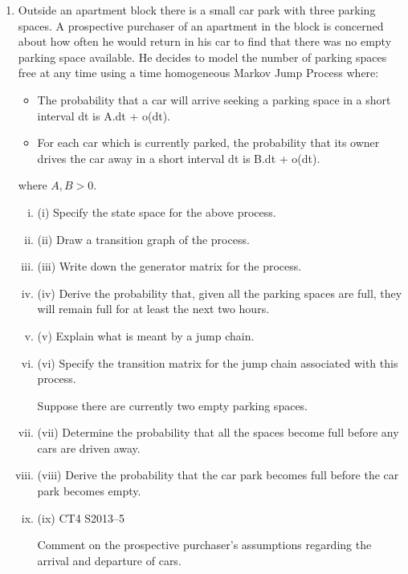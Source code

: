 \documentclass[a4paper,12pt]{article}
\begin{document}
\begin{enumerate}
\item Outside an apartment block there is a small car park with three parking spaces. A
prospective purchaser of an apartment in the block is concerned about how often he
would return in his car to find that there was no empty parking space available. He
decides to model the number of parking spaces free at any time using a time
homogeneous Markov Jump Process where:
\begin{itemize}
\item The probability that a car will arrive seeking a parking space in a short interval
dt is A.dt + o(dt).
\item For each car which is currently parked, the probability that its owner drives the
car away in a short interval dt is B.dt + o(dt).
\end{itemize}
where $A, B > 0$.
\begin{enumerate}[(i)]
\item (i) Specify the state space for the above process. 
\item (ii) Draw a transition graph of the process. 
\item (iii) Write down the generator matrix for the process. 
\item (iv) Derive the probability that, given all the parking spaces are full, they will
remain full for at least the next two hours. 
\item (v) Explain what is meant by a jump chain. 
\item (vi) Specify the transition matrix for the jump chain associated with this process.

Suppose there are currently two empty parking spaces.
\item (vii)
Determine the probability that all the spaces become full before any cars are
driven away.
\item
(viii) Derive the probability that the car park becomes full before the car park
becomes empty.
\item (ix)
CT4 S2013–5

Comment on the prospective purchaser’s assumptions regarding the arrival
and departure of cars.
\end{enumerate}
\end{enumerate}

\newpage
\end{document}
